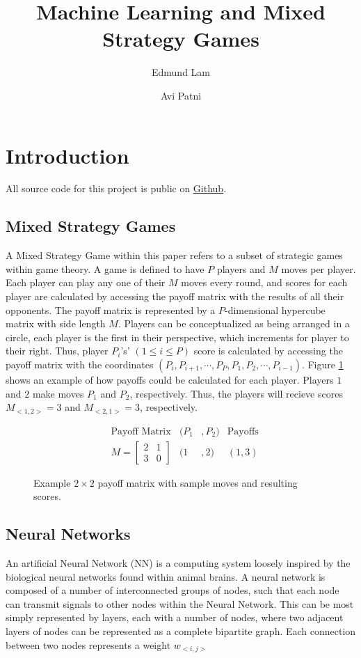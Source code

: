 \documentclass{article}
\title{Machine Learning and Mixed Strategy Games}
\author{Edmund Lam \and Avi Patni}
\begin{document}
\begin{titlepage}
	\maketitle
	\thispagestyle{empty}
\end{titlepage}

\tableofcontents

\section{Introduction}
All source code for this project is public on \href{https://github.com/UnsignedByte/MLMS}{Github}.
\subsection{Mixed Strategy Games}
\label{subsection:MSG}
A Mixed Strategy Game within this paper refers to a subset of strategic games within game theory. A game is defined to have $P$ players and $M$ moves per player. Each player can play any one of their $M$ moves every round, and scores for each player are calculated by accessing the payoff matrix with the results of all their opponents. The payoff matrix is represented by a $P$-dimensional hypercube matrix with side length $M$. Players can be conceptualized as being arranged in a circle, each player is the first in their perspective, which increments for player to their right. Thus, player $P_i$'s' $(1\leq i\leq P)$ score is calculated by accessing the payoff matrix with the coordinates $(P_i, P_{i+1}, \cdots , P_P, P_1, P_2, \cdots , P_{i-1})$. Figure \ref{fig:1} shows an example of how payoffs could be calculated for each player. Players $1$ and $2$ make moves $P_1$ and $P_2$, respectively. Thus, the players will recieve scores $M_{<1,2>}=3$ and $M_{<2,1>}=3$, respectively.

\begin{figure}[h]
  \caption{Example $2\times2$ payoff matrix with sample moves and resulting scores.}
	\label{fig:1}
	\begin{align*}
	&\text{Payoff Matrix} &(P_1&,P_2) &\text{Payoffs}\\
  &M=
  \begin{bmatrix}
	  2 & 1\\
	  3 & 0
  \end{bmatrix}
  &(1&,2)
  &(1,3)
  \end{align*}
\end{figure}

\subsection{Neural Networks}
An artificial Neural Network (NN) is a computing system loosely inspired by the biological neural networks found within animal brains. A neural network is composed of a number of interconnected groups of nodes, such that each node can transmit signals to other nodes within the Neural Network. This can be most simply represented by layers, each with a number of nodes, where two adjacent layers of nodes can be represented as a complete bipartite graph. Each connection between two nodes represents a weight $w_{<i,j>}$
\end{document}
